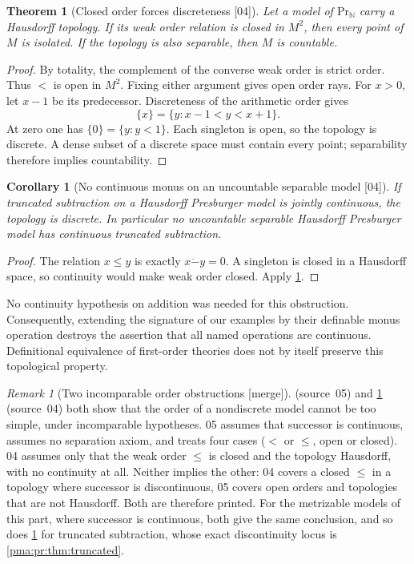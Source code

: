 \documentclass[11pt]{article}
\numberwithin{equation}{section}
\newtheorem{theorem}{Theorem}[section]
\newtheorem{corollary}[corollary]{Corollary}
\theoremstyle{definition}
\theoremstyle{remark}
\newtheorem{remark}[remark]{Remark}
\newcommand{\N}{\mathbb N}
\newcommand{\monus}{\mathbin{\dot{-}}}
\newcommand{\src}[1]{\textup{\textsf{\small[#1]}}}
\newcommand{\mergetag}{\textup{\textsf{\small[merge]}}}
\begin{document}
\begin{theorem}[Closed order forces discreteness \src{04}]\label{pma:pr:thm:closedorder}
Let a model of $\mathrm{Pr}_{\N}$ carry a Hausdorff topology. If its weak
order relation is closed in $M^2$, then every point of $M$ is isolated.
If the topology is also separable, then $M$ is countable.
\end{theorem}

\begin{proof}
By totality, the complement of the converse weak order is strict order.
Thus $<$ is open in $M^2$. Fixing either argument gives open order rays.
For $x>0$, let $x-1$ be its predecessor. Discreteness of the arithmetic
order gives
\[
 \{x\}=\{y:x-1<y<x+1\}.
\]
At zero one has $\{0\}=\{y:y<1\}$. Each singleton is open, so the topology
is discrete. A dense subset of a discrete space must contain every point;
separability therefore implies countability.
\end{proof}

\begin{corollary}[No continuous monus on an uncountable separable model \src{04}]
\label{pma:pr:cor:monusobstruction}
If truncated subtraction on a Hausdorff Presburger model is jointly
continuous, the topology is discrete. In particular no uncountable
separable Hausdorff Presburger model has continuous truncated subtraction.
\end{corollary}

\begin{proof}
The relation $x\leq y$ is exactly $x\monus y=0$. A singleton is closed
in a Hausdorff space, so continuity would make weak order closed. Apply
\cref{pma:pr:thm:closedorder}.
\end{proof}

No continuity hypothesis on addition was needed for this obstruction.
Consequently, extending the signature of our examples by their definable
monus operation destroys the assertion that all named operations are
continuous. Definitional equivalence of first-order theories does not by
itself preserve this topological property.

\begin{remark}[Two incomparable order obstructions \mergetag]\label{pma:pr:rem:twoorder}
 (source~05) and \cref{pma:pr:thm:closedorder}
(source~04) both show that the order of a nondiscrete model cannot be too
simple, under incomparable hypotheses. 05 assumes that successor is
continuous, assumes no separation axiom, and treats four cases ($<$ or $\le$,
open or closed). 04 assumes only that the weak order $\le$ is closed and the
topology Hausdorff, with no continuity at all. Neither implies the other: 04
covers a closed $\le$ in a topology where successor is discontinuous, 05
covers open orders and topologies that are not Hausdorff. Both are therefore
printed. For the metrizable models of this part, where successor is
continuous, both give the same conclusion, and so does
\cref{pma:pr:cor:monusobstruction} for truncated subtraction, whose exact
discontinuity locus is \cref{pma:pr:thm:truncated}.
\end{remark}
\end{document}
